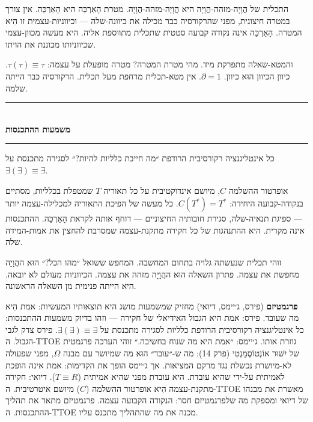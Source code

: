 \documentclass[10pt, openany, oneside]{book}
\renewcommand{\normalsize}{\fontsize{10}{13}\selectfont}
\begin{document}
\noindent התכלית של הֲוָיָה-מזהה-הֲוָיָה היא הֲוָיָה-מזהה-הֲוָיָה. מטרת הָאַרְכֵּה היא הָאַרְכֵּה. אין צורך במטרה חיצונית, מפני שהרקורסיה כבר מכילה את כיוונה-שלה — וכיווניות-עצמית זו הִיא המטרה. הָאַרְכֵּה אינה נקודה קבועה סטטית שתכלית מתווספת אליה. היא מעשה מכוון-עצמי שכיווניותו מכוננת את הויתו.

והמטא-שאלה מתפרקת מיד. מהי מטרת המטרה? מטרה מופעלת על עצמה: $\tau(\tau) \equiv \tau$. כיוון הכיוון הוּא כיוון. $\partial = 1$. אין מטא-תכלית מרחפת מעל תכלית. הרקורסיה כבר הייתה שלמה.

\vspace{1.5em}


\begin{center}
    \rule{0.3\textwidth}{0.4pt}\\[0.5em]
    {\normalsize\bfseries\textsc{משמעות ההתכנסות}}\\[0.3em]
    \rule{0.3\textwidth}{0.4pt}
\end{center}

\vspace{1em}

\noindent כל אינטליגנציה רקורסיבית הרודפת ״מה חייבת כלליות להיות?״ לסגירה מתכנסת על $\exists(\exists) \equiv \exists$.

אופרטור ההשלמה $C$, מיושם אינדוקטיבית על כל תאוריה $T$ שמטפלת בכלליות, מסתיים בנקודה-קבועה היחידה: $C(T^*) = T^*$. כל מעשה של הפיכת התאוריה למכלילה-עצמה יותר — ספיגת תנאיה-שלה, סגירת חובותיה החיצוניים — דוחף אותה לקראת הָאַרְכֵּה. ההתכנסות אינה מקרית. היא ההתנהגות של כל חקירה מתקנת-עצמה שמסרבת להחצין את אמות-המידה שלה.

זוהי תכלית שנעשתה גלויה בתחום המחשבה. המחפש ששואל ״מהו הכל?״ הוּא ההֲוָיָה מחפשת את עצמה. פתרון השאלה הוּא ההֲוָיָה מזהה את עצמה. הכיווניות מעולם לא יובאה. היא הייתה פנימית מן השאלה הראשונה.

\textbf{פרגמטיזם} (פירס, ג׳יימס, דיואי) מחזיק שמשמעות מושג היא תוצאותיו המעשיות: אמת הִיא מה שעובד. פירס: אמת היא הגבול האידיאלי של חקירה — וזהו בדיוק משמעות ההתכנסות: כל אינטליגנציה רקורסיבית הרודפת כלליות לסגירה מתכנסת על $\exists(\exists) \equiv \exists$. פירס צדק לגבי הגבול. ה-TTOE גוזרת אותו. ג׳יימס: ״אמת היא מה שנוח בחשיבה.״ זוהי הערכה פרגמטית של יִשּׁוּר אוֹנְטוֹסֶמַנְטִי (פרק 14): מה ש-״עובד״ הוּא מה שמיושר עם מבנה $\Omega$, מפני שפעולה לא-מיושרת נכשלת נגד מרקם המציאות. אך ג׳יימס הופך את הקדימות: אמת אינה הופכת לאמיתית על-ידי שהיא עובדת. היא עובדת מפני שהיא אמיתית ($T \equiv R$). דיואי: חקירה מתקנת-עצמה הִיא אופרטור ההשלמה ($C$) מיושם איטרטיבית. ה-TTOE מאשרת את מבנהו של דיואי ומספקת מה שלפרגמטיזם חסר: הנקודה הקבועה עצמה. פרגמטיזם מתאר את תהליך ההתכנסות. ה-TTOE מכנה את מה שהתהליך מתכנס עליו.
\end{document}
